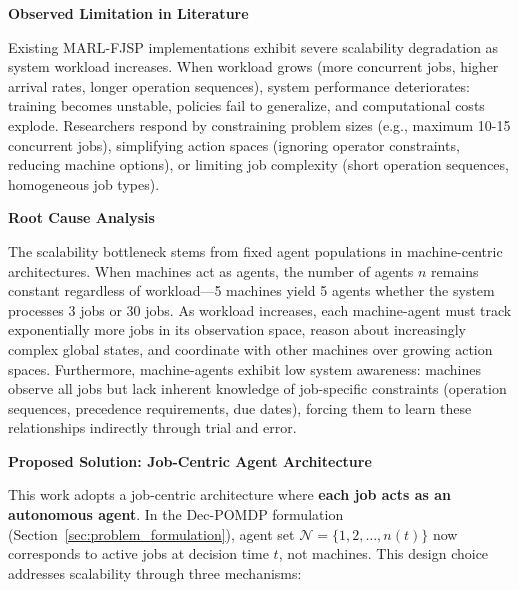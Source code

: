 \textbf{Observed Limitation in Literature}

Existing MARL-FJSP implementations exhibit severe scalability degradation as system workload increases. When workload grows (more concurrent jobs, higher arrival rates, longer operation sequences), system performance deteriorates: training becomes unstable, policies fail to generalize, and computational costs explode. Researchers respond by constraining problem sizes (e.g., maximum 10-15 concurrent jobs), simplifying action spaces (ignoring operator constraints, reducing machine options), or limiting job complexity (short operation sequences, homogeneous job types).

\textbf{Root Cause Analysis}

The scalability bottleneck stems from fixed agent populations in machine-centric architectures. When machines act as agents, the number of agents \( n \) remains constant regardless of workload—5 machines yield 5 agents whether the system processes 3 jobs or 30 jobs. As workload increases, each machine-agent must track exponentially more jobs in its observation space, reason about increasingly complex global states, and coordinate with other machines over growing action spaces. Furthermore, machine-agents exhibit low system awareness: machines observe all jobs but lack inherent knowledge of job-specific constraints (operation sequences, precedence requirements, due dates), forcing them to learn these relationships indirectly through trial and error.

\textbf{Proposed Solution: Job-Centric Agent Architecture}

This work adopts a job-centric architecture where \textbf{each job acts as an autonomous agent}. In the Dec-POMDP formulation (Section~\ref{sec:problem_formulation}), agent set \( \mathcal{N} = \{1, 2, \ldots, n(t)\} \) now corresponds to active jobs at decision time \( t \), not machines. This design choice addresses scalability through three mechanisms:

